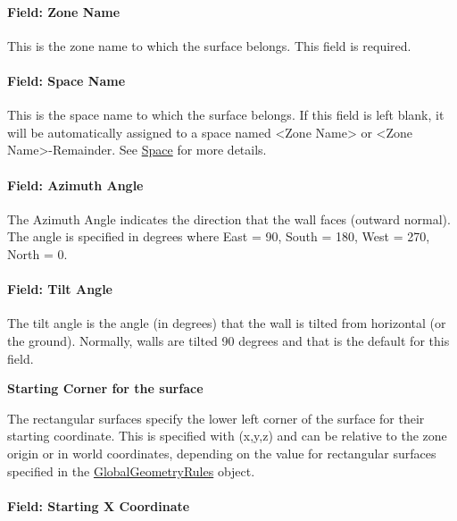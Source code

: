 \paragraph{Field: Zone Name}\label{field-zone-name-012}

This is the zone name to which the surface belongs. This field is required.

\paragraph{Field: Space Name}\label{field-space-name-012}

This is the space name to which the surface belongs. If this field is left blank, it will be automatically assigned to a space named <Zone Name> or <Zone Name>-Remainder. See \hyperref[space]{Space} for more details.

\paragraph{Field: Azimuth Angle}

The Azimuth Angle indicates the direction that the wall faces (outward normal). The angle is specified in degrees where East = 90, South = 180, West = 270, North = 0.

\paragraph{Field: Tilt Angle}

The tilt angle is the angle (in degrees) that the wall is tilted from horizontal (or the ground). Normally, walls are tilted 90 degrees and that is the default for this field.

\begin{callout}
\textbf{Starting Corner for the surface}

The rectangular surfaces specify the lower left corner of the surface for their starting coordinate. This is specified with (x,y,z) and can be relative to the zone origin or in world coordinates, depending on the value for rectangular surfaces specified in the \hyperref[globalgeometryrules]{GlobalGeometryRules} object.
\end{callout}

\paragraph{Field: Starting X Coordinate}\label{field-starting-x-coordinate}

